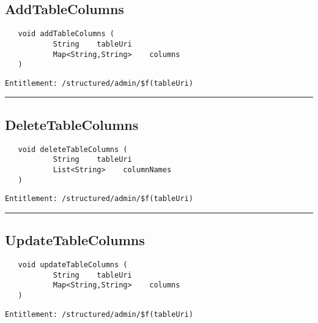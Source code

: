 \subsection{AddTableColumns}
\label{Api:AddTableColumns}
\begin{Verbatim}
   void addTableColumns (
           String    tableUri
           Map<String,String>    columns
   )
\end{Verbatim}
\begin{Verbatim}[formatcom=\color{Maroon}]
  Entitlement: /structured/admin/$f(tableUri)
\end{Verbatim}



\rule{12cm}{2pt}
\subsection{DeleteTableColumns}
\label{Api:DeleteTableColumns}
\begin{Verbatim}
   void deleteTableColumns (
           String    tableUri
           List<String>    columnNames
   )
\end{Verbatim}
\begin{Verbatim}[formatcom=\color{Maroon}]
  Entitlement: /structured/admin/$f(tableUri)
\end{Verbatim}



\rule{12cm}{2pt}
\subsection{UpdateTableColumns}
\label{Api:UpdateTableColumns}
\begin{Verbatim}
   void updateTableColumns (
           String    tableUri
           Map<String,String>    columns
   )
\end{Verbatim}
\begin{Verbatim}[formatcom=\color{Maroon}]
  Entitlement: /structured/admin/$f(tableUri)
\end{Verbatim}



